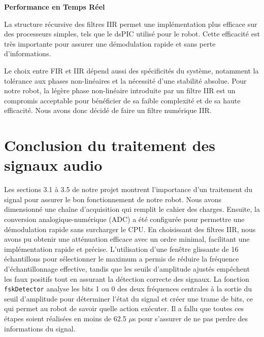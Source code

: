\textbf{Performance en Temps Réel}

La structure récursive des filtres IIR permet une implémentation plus efficace sur des processeurs simples, tels que le dsPIC utilisé pour le robot. Cette efficacité est très importante pour assurer une démodulation rapide et sans perte d'informations.

Le choix entre FIR et IIR dépend aussi des spécificités du système, notamment la tolérance aux phases non-linéaires et la nécessité d'une stabilité absolue. Pour notre robot, la légère phase non-linéaire introduite par un filtre IIR est un compromis acceptable pour bénéficier de sa faible complexité et de sa haute efficacité. Nous avons donc décidé de faire un filtre numérique IIR.





\section{Conclusion du traitement des signaux audio}

Les sections 3.1 à 3.5 de notre projet montrent l'importance d'un traitement du signal  pour assurer le bon fonctionnement de notre robot. Nous avons dimensionné une chaîne d'acquisition qui remplit le cahier des charges. Ensuite, la conversion analogique-numérique (ADC) a été configurée pour permettre une démodulation rapide sans surcharger le CPU. En choisissant des filtres IIR, nous avons pu obtenir une atténuation efficace avec un ordre minimal, facilitant une implémentation rapide et précise. L'utilisation d'une fenêtre glissante de 16 échantillons pour sélectionner le maximum a permis de réduire la fréquence d'échantillonnage effective, tandis que les seuils d'amplitude ajustés empêchent les faux positifs tout en assurant la détection correcte des signaux. La fonction \texttt{fskDetector} analyse les bits 1 ou 0 des deux fréquences centrales à la sortie du seuil d'amplitude pour déterminer l'état du signal et créer une trame de bits, ce qui permet au robot de savoir quelle action exécuter. Il a fallu que toutes ces étapes soient réalisées en moins de 62.5 $\mu$s pour s'assurer de ne pas perdre des informations du signal.

